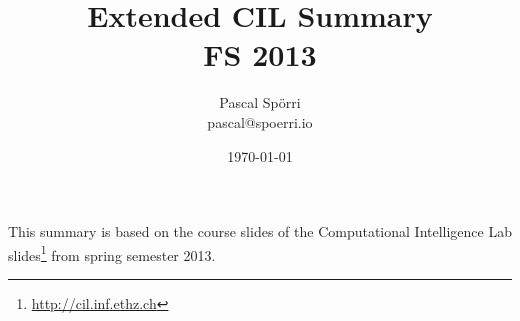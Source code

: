 \documentclass[a4paper]{scrartcl}
\author{Pascal Spörri\\pascal@spoerri.io}
\title{Extended CIL Summary\\ FS 2013\\ }
\date{\today}
\begin{document}
\maketitle
This summary is based on the course slides of the Computational Intelligence Lab slides\footnote{\url{http://cil.inf.ethz.ch}} from spring semester 2013.
\newpage
\tableofcontents










\end{document}
